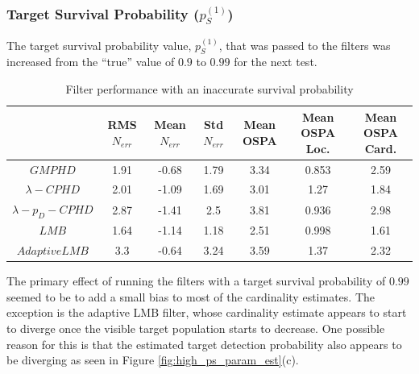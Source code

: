 \documentclass{article}
\newcommand{\tgt}{{(1)}}
\begin{document}
\subsubsection*{Target Survival Probability ($p_S^{(1)}$)}
The target survival probability value, $p_S^\tgt$, that was passed to the filters was increased from the ``true'' value of $0.9$ to $0.99$ for the next test.
\begin{table}[H]
  \centering
\begin{tabular}{ c| c | c | c | c | c | c }
   & RMS $N_{err}$ & Mean $N_{err}$ & Std $N_{err}$ & Mean OSPA & Mean OSPA Loc. & Mean OSPA Card.\\
\hline
  $GMPHD$ & 1.91 & -0.68 & 1.79 & 3.34 & 0.853 & 2.59 \\
  $\lambda-CPHD$ & 2.01 & -1.09 & 1.69 & 3.01 & 1.27 & 1.84 \\
  $\lambda-p_D-CPHD$ & 2.87 & -1.41 & 2.5 & 3.81 & 0.936 & 2.98 \\
  $LMB$ & 1.64 & -1.14 & 1.18 & 2.51 & 0.998 & 1.61 \\
  $Adaptive LMB$ & 3.3 & -0.64 & 3.24 & 3.59 & 1.37 & 2.32 \\
\end{tabular}
  \caption{Filter performance with an inaccurate survival probability}
  \label{tab:high_ps}
\end{table}
The primary effect of running the filters with a target survival probability of $0.99$ seemed to be to add a small bias to most of the cardinality estimates. The exception is the adaptive LMB filter, whose cardinality estimate appears to start to diverge once the visible target population starts to decrease. One possible reason for this is that the estimated target detection probability also appears to be diverging as seen in Figure \ref{fig:high_ps_param_est}(c).
\end{document}
